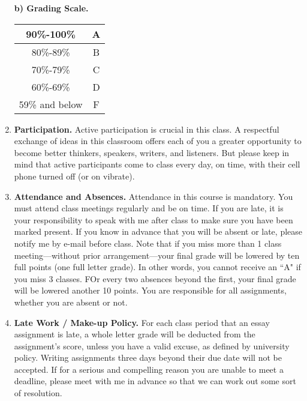 \documentclass[9pt]{article}
\begin{document}
\begin{enumerate}
         \textbf{b) Grading Scale.} 
         \begin{center}
            \begin{tabular}{@{}|c|c|@{}} \hline
               90\%-100\% & A \\ \hline
               80\%-89\% & B \\ \hline
               70\%-79\% & C \\ \hline
               60\%-69\% & D \\ \hline
               59\% and below & F \\ \hline
            \end{tabular}
         \end{center}          
   \item \textbf{Participation.} Active participation is crucial in this class.
         A respectful exchange of ideas in this classroom offers each of you a
         greater opportunity to become better thinkers, speakers, writers, and
         listeners. But please keep in mind that active participants come to
         class every day, on time, with their cell phone turned off (or on
         vibrate).
   \item \textbf{Attendance and Absences.} Attendance in this course is
         mandatory. You must attend class meetings regularly and be on time. If
         you are late, it is your responsibility to speak with me after class
         to make sure you have been marked present. If you know in advance that
         you will be absent or late, please notify me by e-mail before class.
         Note that if you miss more than 1 class meeting---without prior
         arrangement---your final grade will be lowered by ten full points (one
         full letter grade). In other words, you cannot receive an ``A" if you
         miss 3 classes. FOr every two absences beyond the first, your final
         grade will be lowered another 10 points. You are responsible for all
         assignments, whether you are absent or not.
         
   \item \textbf{Late Work / Make-up Policy.} For each class period that an essay
         assignment is late, a whole letter grade will be deducted from the
         assignment's score, unless you have a valid excuse, as defined by
         university policy. Writing assignments three days beyond their due date
         will not be accepted. If for a serious and compelling reason you are
         unable to meet a deadline, please meet with me in advance so that we
         can work out some sort of resolution.
         

\end{enumerate}
\end{document}
